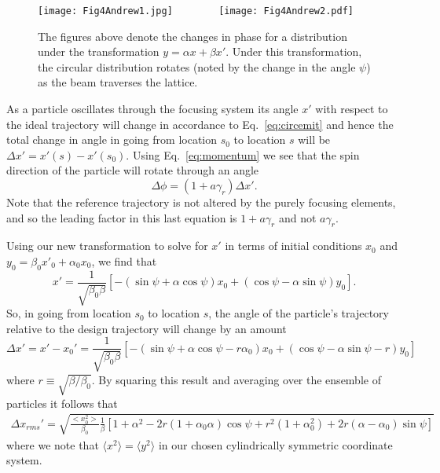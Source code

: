 \documentclass[12pt]{article}
\begin{document}
\begin{figure}
\centering
\texttt{[image: Fig4Andrew1.jpg]}
~~~~~~~
\texttt{[image: Fig4Andrew2.pdf]}
\caption[Emittance of circular distribution]{The figures above denote the changes in phase for a distribution under the transformation $y=\alpha x + \beta x'$. Under this transformation, the circular distribution rotates (noted by the change in the angle $\psi$) as the beam traverses the lattice.}
\label{fig:emittance_circles}
\end{figure}

As a particle oscillates through the focusing system its angle $x'$ with respect to the ideal trajectory will change in accordance to Eq.~\ref{eq:circemit} and hence the total change in angle in going from location $s_0$ to location $s$ will be $\Delta x' = x'(s) - x'(s_0)$.  Using Eq.~\ref{eq:momentum} we see that the spin direction of the particle will rotate through an angle
\begin{equation}
\Delta \phi = (1+a \gamma_r) \Delta x'.
\end{equation}
Note that the reference trajectory is not altered by the purely focusing elements, and so the leading factor in this last equation is $1+a\gamma_r$ and not $a\gamma_r$.

Using our new transformation to solve for $x'$ in terms of initial conditions $x_0$ and $y_0 = \beta_0 x'_0 + \alpha_0 x_0$, we find that
\begin{equation}
x' = \frac{1}{\sqrt{\beta_0 \beta}} \left[ -(\sin \psi + \alpha \cos \psi) x_0 + (\cos \psi - \alpha \sin \psi) y_0  \right].
\end{equation}
So, in going from location $s_0$ to location $s$, the angle of the particle's trajectory relative to the design trajectory will change by an amount
\begin{equation}
\Delta x' = x' - x_0' = \frac{1}{\sqrt{\beta_0 \beta}} \left[ - (\sin \psi + \alpha \cos \psi - r \alpha_0 ) x_0 + (\cos \psi - \alpha \sin \psi - r) y_0 \right]
\end{equation}
where $r \equiv \sqrt{\beta / \beta_0}$.  By squaring this result and averaging over the ensemble of particles it follows that
\begin{multline}
\Delta x_{rms}' = \sqrt{\frac{<x_0^2>}{\beta_0} \frac{1}{\beta} \left[ 1 + \alpha^2 - 2r(1 + \alpha_0 \alpha) \cos \psi + r^2 (1 + \alpha_0^2) + 2r(\alpha - \alpha_0) \sin \psi \right]}
\end{multline}
where we note that $\langle x^2 \rangle = \langle y^2 \rangle$ in our chosen cylindrically symmetric coordinate system. 
\end{document}

